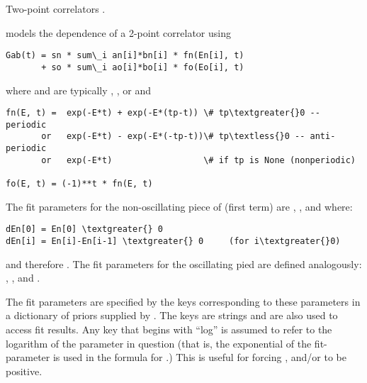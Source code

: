 \documentclass[letterpaper,10pt,english]{sphinxmanual}
\begin{document}
\begin{fulllineitems}
\label{corrfitter:corrfitter.Corr2}
Two-point correlators .

{\hyperref[corrfitter:corrfitter.Corr2]{}} models the  dependence of a 2-point correlator 
using

\begin{Verbatim}[commandchars=\\\{\}]
Gab(t) = sn * sum\_i an[i]*bn[i] * fn(En[i], t)
       + so * sum\_i ao[i]*bo[i] * fo(Eo[i], t)
\end{Verbatim}

where  and  are typically , , or  and

\begin{Verbatim}[commandchars=\\\{\}]
fn(E, t) =  exp(-E*t) + exp(-E*(tp-t)) \# tp\textgreater{}0 -- periodic
       or   exp(-E*t) - exp(-E*(-tp-t))\# tp\textless{}0 -- anti-periodic
       or   exp(-E*t)                  \# if tp is None (nonperiodic)

fo(E, t) = (-1)**t * fn(E, t)
\end{Verbatim}

The fit parameters for the non-oscillating piece of  (first term)
are , , and  where:

\begin{Verbatim}[commandchars=\\\{\}]
dEn[0] = En[0] \textgreater{} 0
dEn[i] = En[i]-En[i-1] \textgreater{} 0     (for i\textgreater{}0)
\end{Verbatim}

and therefore . The fit parameters for
the oscillating pied are defined analogously: , ,
and .

The fit parameters are specified by the keys corresponding to these
parameters in a dictionary of priors supplied by {\hyperref[corrfitter:corrfitter.CorrFitter]{}}. The keys
are strings and are also used to access fit results. Any key that
begins with ``log'' is assumed to refer to the logarithm of the parameter
in question (that is, the exponential of the fit-parameter is used in
the formula for .) This is useful for forcing , 
and/or  to be positive.


\end{fulllineitems}
\end{document}
